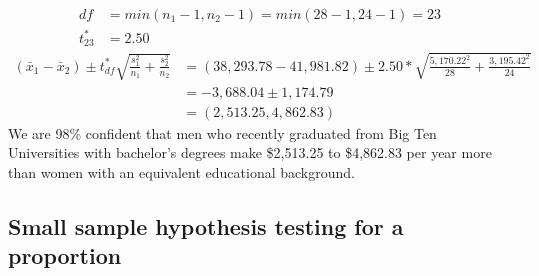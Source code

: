 %

{
\begin{align*}
df &= min(n_1 - 1,  n_2 - 1) = min(28 - 1, 24 - 1) = 23 \\
t^*_{23} &= 2.50
\end{align*}
\begin{align*}
(\bar{x}_1 - \bar{x}_2) \pm t^*_{df}  \sqrt{\frac{s_1^2}{n_1} + \frac{s_2^2}{n_2}} &= (38,293.78 - 41,981.82) \pm 2.50 * \sqrt{\frac{5,170.22 ^2}{28} + \frac{3,195.42 ^2}{24}} \\
&= -3,688.04 \pm 1,174.79 \\
&= (2,513.25, 4,862.83)
\end{align*}
We are 98\% confident that men who recently graduated from Big Ten Universities with bachelor's degrees make \$2,513.25 to \$4,862.83 per year more than women with an equivalent educational background.
}

%

\subsection{Small sample hypothesis testing for a proportion}

